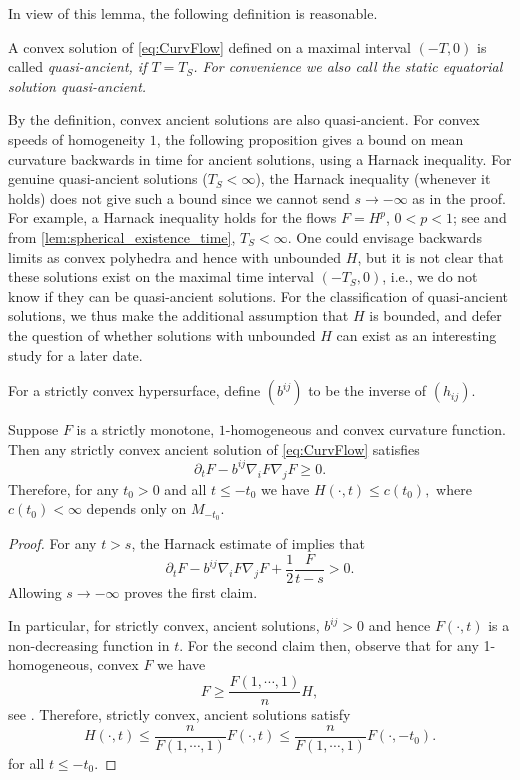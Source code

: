 \documentclass{amsart}
\begin{document}
In view of this lemma, the following definition is reasonable.
\begin{defn}\label{Quasi}
A convex solution of \eqref{eq:CurvFlow} defined on a maximal interval $(-T,0)$ is called \it{quasi-ancient}, if $T=T_S$. For convenience we also call the static equatorial solution quasi-ancient. 
\end{defn}
 By the definition, convex ancient solutions are also quasi-ancient.
For convex speeds of homogeneity $1$, the following proposition gives a bound on mean curvature backwards in time for ancient solutions, using a Harnack inequality. For genuine quasi-ancient solutions ($T_S < \infty$), the Harnack inequality (whenever it holds) does not give such a bound since we cannot send \(s \to -\infty\) as in the proof. For example, a Harnack inequality holds for the flows $F = H^p$, $0<p<1$; see \cite[Theorem 1]{BryanIvakiScheuer:12/2015} and from \cref{lem:spherical_existence_time}, $T_S < \infty$. One could envisage backwards limits as convex polyhedra and hence with unbounded \(H\), but it is not clear that these solutions exist on the maximal time interval \((-T_S, 0)\), i.e., we do not know if they can be quasi-ancient solutions. For the classification of quasi-ancient solutions, we thus make the additional assumption that \(H\) is bounded, and defer the question of whether solutions with unbounded \(H\) can exist as an interesting study for a later date.

For a strictly convex hypersurface, define $(b^{ij})$ to be the inverse of $(h_{ij}).$

\begin{prop}
\label{cor:boundedH}
Suppose $F$ is a strictly monotone, \(1\)-homogeneous and convex curvature function. Then any strictly convex ancient solution of \eqref{eq:CurvFlow} satisfies
\[\partial_t F-b^{ij}\nabla_i F \nabla_j F \geq 0.\]
Therefore, for any $t_0 > 0$ and all $t\le -t_0$ we have
$H(\cdot,t)\leq c(t_0),$
where $c(t_0)<\infty$ depends only on $M_{-t_0}.$
\end{prop}
\begin{proof}
For any $t>s$, the  Harnack estimate of \cite[Theorem 1]{BryanIvakiScheuer:12/2015} implies that
$$\partial_t F-b^{ij}\nabla_i F\nabla_j F+\frac{1}{2}\frac{F}{t-s}>0.$$
Allowing $s\to-\infty$ proves the first claim.

In particular, for strictly convex, ancient solutions, $b^{ij} > 0$ and hence $F(\cdot, t)$ is a non-decreasing function in $t$. For the second claim then, observe that for any 1-homogeneous, convex $F$ we have \[F\ge \frac{F(1,\cdots,1)}{n}H,\]
see \cite[Lemma~2.2.20]{Gerhardt:/2006}. Therefore, strictly convex, ancient solutions satisfy
\[H(\cdot,t)\leq \frac{n}{F(1,\cdots,1)}F(\cdot,t)\leq \frac{n}{F(1,\cdots,1)}F(\cdot,-t_0). \]
for all \(t \leq -t_0\).
\end{proof}
\end{document}
